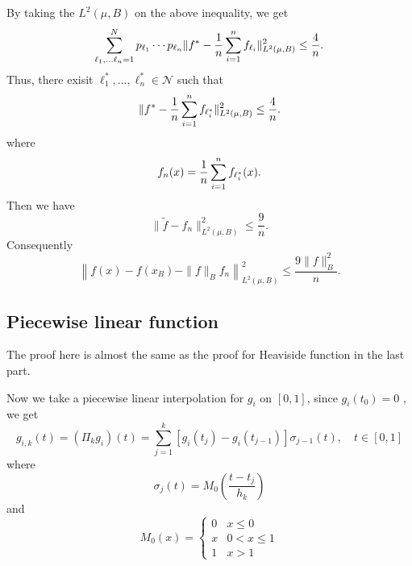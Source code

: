 By taking the $L^2(\mu,B)$ on the above inequality, we get
$$
\sum_{\ell_1,\ldots \ell_n=1}^Np_{\ell_1}\cdots p_{\ell_n}\|f^*-{1\over n}\sum_{i=1}^n f_{\ell_i}\|_{L^2(\mu,B)}^2
\le\frac4n.
$$
Thus, there exisit $\ell_1^*, \ldots, \ell_n^*\in \mathcal N$ such that
$$
\|f^*-{1\over n}\sum_{i=1}^n f_{\ell_i^*}\|_{L^2(\mu,B)}^2
\le\frac4n.
$$
where
$$
f_n(x)={1\over n}\sum_{i=1}^n f_{\ell_i^*}(x).
$$
Then we have 
\begin{equation}
\|\tilde f-f_n\|^2_{L^2(\mu,B)}\le \frac{9}{n}.
\end{equation}
Consequently
\begin{equation}
\left\|f(x)-f(x_B)-\|f\|_Bf_n\right\|^2_{L^2(\mu,B)}\le \frac{9\|f\|^2_B}{n}.
\end{equation}

\subsection{Piecewise linear function}
The proof here is almost the same as the proof for Heaviside function in the last part. 

Now we take a piecewise linear interpolation for $g_i$ on $[0,1]$, since $g_i(t_0)=0$ , we get
$$
g_{i,k}(t)=(\Pi_kg_i)(t)=\sum_{j=1}^{k}[g_i(t_{j})-g_i(t_{j-1})]\sigma_{j-1}(t),   \quad t\in [0,1]
$$
where
$$
\sigma_j(t)=M_0(\frac{t-t_j}{h_k})
$$
and
\begin{equation}
\label{cardinal}
M_0(x)=
\left\{
\begin{array}{ll}
0 & x\le0 \\
x & 0< x\le1    \\
1 & x > 1    
\end{array}
\right.
\end{equation}

